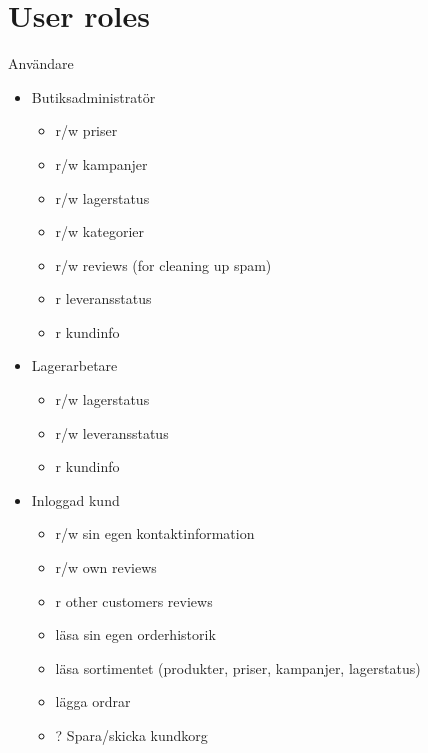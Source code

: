\documentclass[paper=a4, fontsize=11pt]{report} %
\begin{document}
\section*{User roles}

%

Användare
\begin{itemize}
	\item Butiksadministratör
		\begin{itemize}
			\item r/w priser
			\item r/w kampanjer
			\item r/w lagerstatus
			\item r/w kategorier
			\item r/w reviews (for cleaning up spam)
			\item r leveransstatus
			\item r kundinfo
		\end{itemize}
	\item Lagerarbetare
		\begin{itemize}
			\item r/w lagerstatus
			\item r/w leveransstatus
			\item r kundinfo
		\end{itemize}
	\item Inloggad kund
		\begin{itemize}
			\item r/w sin egen kontaktinformation
			\item r/w own reviews
			\item r other customers reviews
			\item läsa sin egen orderhistorik
			\item läsa sortimentet (produkter, priser, kampanjer, lagerstatus)
			\item lägga ordrar
			\item ? Spara/skicka kundkorg
		\end{itemize}


\end{itemize}
\end{document}
